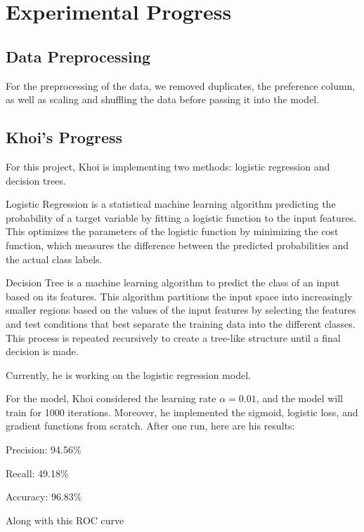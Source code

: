 \section{Experimental Progress}

\subsection{Data Preprocessing}

For the preprocessing of the data, we removed duplicates, the preference column, as well as scaling and shuffling the data before passing it into the model.

\subsection{Khoi's Progress}

For this project, Khoi is implementing two methods: logistic regression and decision trees.

Logistic Regression is a statistical machine learning algorithm predicting the probability of a target variable by fitting a logistic function to the input features. This optimizes the parameters of the logistic function by minimizing the cost function, which measures the difference between the predicted probabilities and the actual class labels.

Decision Tree is a machine learning algorithm to predict the class of an input based on its features. This algorithm partitions the input space into increasingly smaller regions based on the values of the input features by selecting the features and test conditions that best separate the training data into the different classes. This process is repeated recursively to create a tree-like structure until a final decision is made.

Currently, he is working on the logistic regression model.

For the model, Khoi considered the learning rate $\alpha = 0.01$, and the model will train for 1000 iterations. Moreover, he implemented the sigmoid, logistic loss, and gradient functions from scratch. After one run, here are his results:

Precision: 94.56\%

Recall: 49.18\%

Accuracy: 96.83\%

Along with this ROC curve

